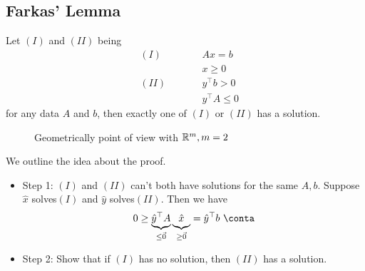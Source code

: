 \subsection{Farkas' Lemma}
\begin{lemma}\label{lma:Farkas-lemma}
	Let \((I)\) and \((II)\) being
	\[
		\begin{alignedat}{3}
			& (I) \qquad&& Ax = b       \\
			&      && x\geq 0      \\
			& (II) \qquad&& y^{\top}b > 0 \\
			&      && y^{\top}A\leq 0
		\end{alignedat}
	\]
	for any data \(A\) and \(b\), then exactly one of \((I)\) or \((II)\) has a solution.
	\begin{figure}[H]
		\centering
		\caption{Geometrically point of view with \(\mathbb{\MakeUppercase{R}}^m, m = 2\) }
		\label{fig:Farkas-lemma}
	\end{figure}
\end{lemma}

\begin{intuition}
	We outline the idea about the proof.
	\begin{itemize}
		\item Step 1: \((I)\) and \((II)\) can't both have solutions for the same \(A, b\).
		      Suppose \(\hat{x}\) solves\((I)\) and \(\hat{y}\) solves\((II)\). Then we have
		      \[
			      0\geq \underbrace{\hat{y}^{\top} A}_{\leq \vec{0}} \underbrace{\vphantom{\hat{y}^{\top}A} \hat{x}}_{\geq \vec{0}} = \hat{y}^{\top} b\ \conta
		      \]
		\item Step 2: Show that if \((I)\) has no solution, then \((II)\) has a solution.
	\end{itemize}
\end{intuition}